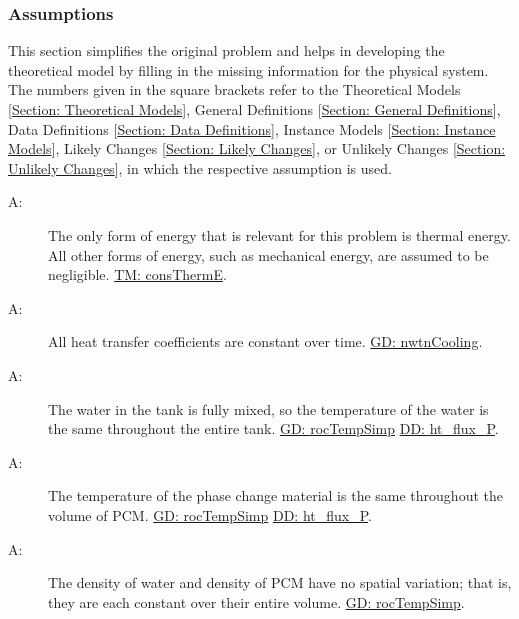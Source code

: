 \documentclass[12pt]{article}
\newcounter{assumpnum}
\newcommand{\atheassumpnum}{A\theassumpnum}
\begin{document}
\subsubsection{Assumptions}
\label{Sec:Assumps}
This section simplifies the original problem and helps in developing the theoretical model by filling in the missing information for the physical system. The numbers given in the square brackets refer to the Theoretical Models {[}\hyperref[Sec:TMs]{Section: Theoretical Models}{]}, General Definitions {[}\hyperref[Sec:GDs]{Section: General Definitions}{]}, Data Definitions {[}\hyperref[Sec:DDs]{Section: Data Definitions}{]}, Instance Models {[}\hyperref[Sec:IMs]{Section: Instance Models}{]}, Likely Changes {[}\hyperref[Sec:LCs]{Section: Likely Changes}{]}, or Unlikely Changes {[}\hyperref[Sec:UCs]{Section: Unlikely Changes}{]}, in which the respective assumption is used.
\begin{description}
\item[\atheassumpnum\label{A:Thermal-Energy-Only}:]The only form of energy that is relevant for this problem is thermal energy. All other forms of energy, such as mechanical energy, are assumed to be negligible. \hyperref[T:consThermE]{TM: consThermE}.
\end{description}
\begin{description}
\item[\atheassumpnum\label{A:Heat-Transfer-Coeffs-Constant}:]All heat transfer coefficients are constant over time. \hyperref[GD:nwtnCooling]{GD: nwtnCooling}.
\end{description}
\begin{description}
\item[\atheassumpnum\label{A:Constant-Water-Temp-Across-Tank}:]The water in the tank is fully mixed, so the temperature of the water is the same throughout the entire tank. \hyperref[GD:rocTempSimp]{GD: rocTempSimp} \hyperref[DD:ht.flux.P]{DD: ht\_flux\_P}.
\end{description}
\begin{description}
\item[\atheassumpnum\label{A:Temp-PCM-Constant-Across-Volume}:]The temperature of the phase change material is the same throughout the volume of PCM. \hyperref[GD:rocTempSimp]{GD: rocTempSimp} \hyperref[DD:ht.flux.P]{DD: ht\_flux\_P}.
\end{description}
\begin{description}
\item[\atheassumpnum\label{A:Density-Water-PCM-Constant-over-Volume}:]The density of water and density of PCM have no spatial variation; that is, they are each constant over their entire volume. \hyperref[GD:rocTempSimp]{GD: rocTempSimp}.
\end{description}
\end{document}
